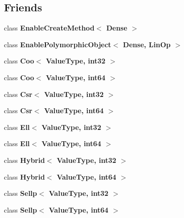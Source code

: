 \subsection*{Friends}
\begin{DoxyCompactItemize}
\item 
\mbox{\label{classgko_1_1matrix_1_1Dense_abd9e1a91c3032b40a099a6dfd8a20357}} 
class {\bfseries Enable\+Create\+Method$<$ Dense $>$}
\item 
\mbox{\label{classgko_1_1matrix_1_1Dense_a4a3589cf55dd24284a1efc83c364abdd}} 
class {\bfseries Enable\+Polymorphic\+Object$<$ Dense, Lin\+Op $>$}
\item 
\mbox{\label{classgko_1_1matrix_1_1Dense_ae83eb9050ed525f7b709f0bdf5d7f42d}} 
class {\bfseries Coo$<$ Value\+Type, int32 $>$}
\item 
\mbox{\label{classgko_1_1matrix_1_1Dense_a9e60da00466bd4fe8882eeb1353a0bda}} 
class {\bfseries Coo$<$ Value\+Type, int64 $>$}
\item 
\mbox{\label{classgko_1_1matrix_1_1Dense_a4df13336280c2189acd768b2c36a893d}} 
class {\bfseries Csr$<$ Value\+Type, int32 $>$}
\item 
\mbox{\label{classgko_1_1matrix_1_1Dense_a56c2ebf8cdf7a7f1f17fc25dd47ea1e9}} 
class {\bfseries Csr$<$ Value\+Type, int64 $>$}
\item 
\mbox{\label{classgko_1_1matrix_1_1Dense_ad7ddb8eeb31b9072ddc018a8da4c35ea}} 
class {\bfseries Ell$<$ Value\+Type, int32 $>$}
\item 
\mbox{\label{classgko_1_1matrix_1_1Dense_af02a642014ce5fe127ea99e008261e5e}} 
class {\bfseries Ell$<$ Value\+Type, int64 $>$}
\item 
\mbox{\label{classgko_1_1matrix_1_1Dense_a0657cb0f724d51f6c0402314c9c65794}} 
class {\bfseries Hybrid$<$ Value\+Type, int32 $>$}
\item 
\mbox{\label{classgko_1_1matrix_1_1Dense_aa8a237ac1a805519c155815ea7b6319a}} 
class {\bfseries Hybrid$<$ Value\+Type, int64 $>$}
\item 
\mbox{\label{classgko_1_1matrix_1_1Dense_a8973c263e45b8d6efc42c761a593ac13}} 
class {\bfseries Sellp$<$ Value\+Type, int32 $>$}
\item 
\mbox{\label{classgko_1_1matrix_1_1Dense_a567a0b5cf006e176648442b07699ecf7}} 
class {\bfseries Sellp$<$ Value\+Type, int64 $>$}
\end{DoxyCompactItemize}


